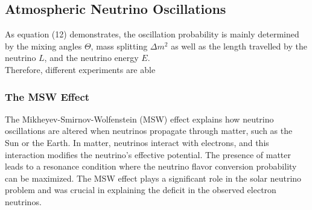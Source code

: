\documentclass[a4paper,12pt,numbered]{article}
\begin{document}
\subsection{Atmospheric Neutrino Oscillations}

As equation (12) demonstrates, the oscillation probability is mainly determined by the mixing angles $\Theta$, mass splitting $\Delta m^2$ as well as the length travelled by the neutrino $L$, and the neutrino energy $E$.
\\
Therefore, different experiments are able 

\begin{table}[h!]
\centering
{}
\caption{Types of Neutrinos and Their Oscillation Sensitivities}

\end{table}

\subsubsection{The MSW Effect}

The Mikheyev-Smirnov-Wolfenstein (MSW) effect explains how neutrino oscillations are altered when neutrinos propagate through matter, such as the Sun or the Earth. In matter, neutrinos interact with electrons, and this interaction modifies the neutrino's effective potential. The presence of matter leads to a resonance condition where the neutrino flavor conversion probability can be maximized. The MSW effect plays a significant role in the solar neutrino problem and was crucial in explaining the deficit in the observed electron neutrinos.
\end{document}
